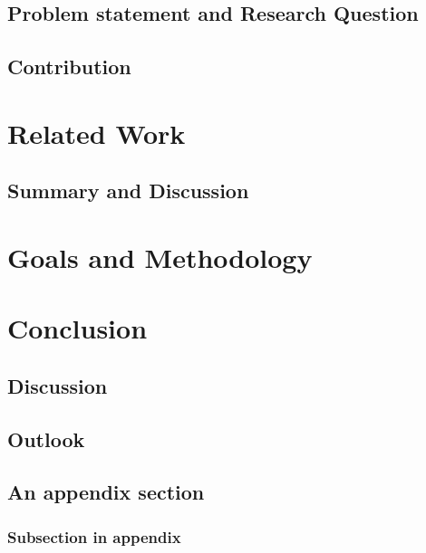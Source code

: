\documentclass[
ngerman, english,%
twoside, %
toc=bib, %
BCOR=6mm, %
ingenieurin, %
]{isw_smb_diss} %
\numberwithin{equation}{chapter} %
\begin{document}
\section{Problem statement and Research Question}
\section{Contribution}

\chapter{Related Work}
\section{Summary and Discussion}

\chapter{Goals and Methodology}


\chapter{Conclusion}
\section{Discussion}
\section{Outlook}

\nocite{*}

\setlength{\emergencystretch}{.5em}
\printbibliography





\startSMBAppendix

\section{An appendix section}
\subsection{Subsection in appendix}
\end{document}
